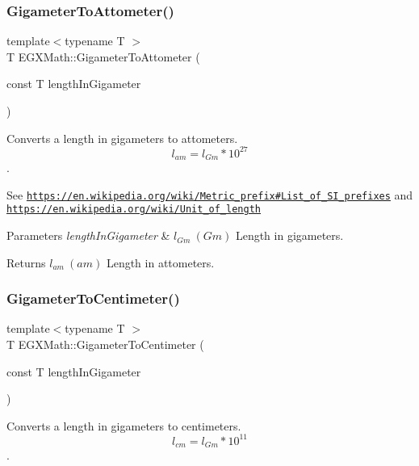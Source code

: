 \subsubsection{\texorpdfstring{Gigameter\+To\+Attometer()}{GigameterToAttometer()}}
{\footnotesize\ttfamily template$<$typename T $>$ \\
T E\+G\+X\+Math\+::\+Gigameter\+To\+Attometer (\begin{DoxyParamCaption}\item[{const T}]{length\+In\+Gigameter }\end{DoxyParamCaption})}



Converts a length in gigameters to attometers. \[ l_{am}=l_{Gm} * 10^{27} \]. 

See \href{https://en.wikipedia.org/wiki/Metric_prefix#List_of_SI_prefixes}{\tt https\+://en.\+wikipedia.\+org/wiki/\+Metric\+\_\+prefix\#\+List\+\_\+of\+\_\+\+S\+I\+\_\+prefixes} and \href{https://en.wikipedia.org/wiki/Unit_of_length}{\tt https\+://en.\+wikipedia.\+org/wiki/\+Unit\+\_\+of\+\_\+length} 
\begin{DoxyParams}{Parameters}
{\em length\+In\+Gigameter} & $ l_{Gm}\ (Gm)$ Length in gigameters. \\
\hline
\end{DoxyParams}
\begin{DoxyReturn}{Returns}
$ l_{am}\ (am)$ Length in attometers. 
\end{DoxyReturn}
\mbox{\label{group___e_g_x_math-_conversions-_length_conversions-_gigameter-_s_i_gac0fc033ff4b887e157a333cde344b824}} 
\subsubsection{\texorpdfstring{Gigameter\+To\+Centimeter()}{GigameterToCentimeter()}}
{\footnotesize\ttfamily template$<$typename T $>$ \\
T E\+G\+X\+Math\+::\+Gigameter\+To\+Centimeter (\begin{DoxyParamCaption}\item[{const T}]{length\+In\+Gigameter }\end{DoxyParamCaption})}



Converts a length in gigameters to centimeters. \[ l_{cm}=l_{Gm} * 10^{11} \]. 

